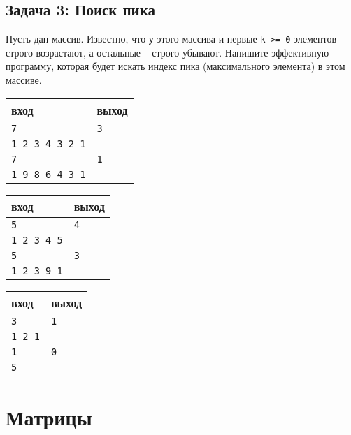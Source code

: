 \documentclass{article}
\begin{document}
\subsection*{Задача 3: Поиск пика}
Пусть дан массив. Известно, что у этого массива и первые \texttt{k >= 0} элементов строго возрастают, а остальные -- строго убывают. Напишите эффективную программу, которая будет искать индекс пика (максимального элемента) в этом массиве.

\begin{multicols}{3}
\begin{center}
\begin{tabular}{ l | l }
 вход & выход \\ \hline
 \texttt{7} & \texttt{3}  \\  
 \texttt{1 2 3 4 3 2 1} & \\\hline
 \texttt{7} & \texttt{1}  \\  
 \texttt{1 9 8 6 4 3 1} & \\
\end{tabular}
\end{center}

\begin{center}
\begin{tabular}{ l | l }
 вход & выход \\ \hline
 \texttt{5} & \texttt{4}  \\  
 \texttt{1 2 3 4 5} & \\ \hline
 \texttt{5} & \texttt{3}  \\  
 \texttt{1 2 3 9 1} & \\
\end{tabular}
\end{center}

\begin{center}
\begin{tabular}{ l | l }
 вход & выход \\ \hline
 \texttt{3} & \texttt{1}  \\  
 \texttt{1 2 1} & \\ \hline
 \texttt{1} & \texttt{0}  \\  
 \texttt{5} & \\
\end{tabular}
\end{center}
\end{multicols}


\newpage
\section*{Матрицы}
\end{document}
